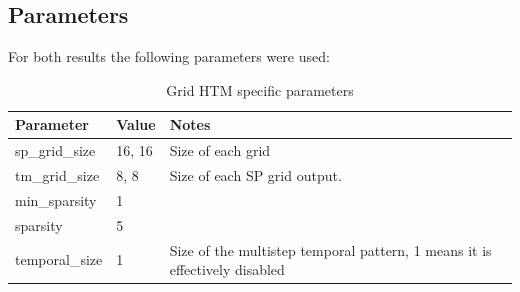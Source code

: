 \subsection{Parameters}
For both results the following parameters were used:
\begin{table}[H]
    \centering
    \begin{tabularx}{\linewidth}{@{}XlX@{}}
        \toprule
        \textbf{Parameter} & \textbf{Value} & \textbf{Notes}                                                             \\
        \midrule
        sp\_grid\_size     & 16, 16         & Size of each grid                                                          \\
        tm\_grid\_size     & 8, 8           & Size of each SP grid output.                                               \\
        min\_sparsity      & 1              &                                                                            \\
        sparsity           & 5              &                                                                            \\
        temporal\_size     & 1              & Size of the multistep temporal pattern, 1 means it is effectively disabled \\
        \bottomrule
    \end{tabularx}
    \caption{Grid HTM specific parameters}
    \label{tab:sperm_params}
\end{table}

